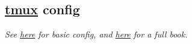 \subsection*{\href{https://www.hamvocke.com/blog/a-quick-and-easy-guide-to-tmux/}{tmux} config}
\textit{See \href{https://www.hamvocke.com/blog/a-guide-to-customizing-your-tmux-conf/}{here} for basic  config, and \href{https://leanpub.com/the-tao-of-tmux/read\#leanpub-auto-book-updates-and-tmux-changes}{here} for a full book.}
